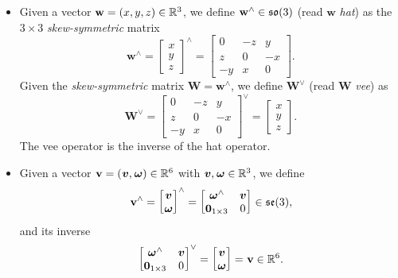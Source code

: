 \begin{itemize}
\item
Given a vector $\mathbf{w} = (x, y, z) \in \mathbb{R}^3$, we define $\mathbf{w}^\wedge \in \mathfrak{so}(3)$ (read $\mathbf{w}$ \emph{hat}) as the $3 \times 3$ \emph{skew-symmetric} matrix
%
\begin{equation*}
    \mathbf{w}^\wedge = \begin{bmatrix} x \\ y \\ z \end{bmatrix}^\wedge = \begin{bmatrix} 0 & -z & y \\ z & 0 & -x \\ -y & x & 0 \end{bmatrix}
    .
\end{equation*}
%
Given the \emph{skew-symmetric} matrix $\mathbf{W} = \mathbf{w}^\wedge$, we define $\mathbf{W}^\vee$ (read $\mathbf{W}$ \emph{vee}) as
%
\begin{equation*}
    \mathbf{W}^\vee = \begin{bmatrix} 0 & -z & y \\ z & 0 & -x \\ -y & x & 0 \end{bmatrix}^\vee = \begin{bmatrix} x \\ y \\ z \end{bmatrix}.
\end{equation*}
%
The vee operator is the inverse of the hat operator.

\item
Given a vector $\prescript{}{}{\mathbf{v}} = (\prescript{}{}{\boldsymbol{v}}, \prescript{}{}{\boldsymbol{\omega}}) \in \mathbb{R}^6$ with $\prescript{}{}{\boldsymbol{v}}, \prescript{}{}{\boldsymbol{\omega}} \in \mathbb{R}^3$, we define
%
\begin{equation*}
    \prescript{}{}{\mathbf{v}}^\wedge 
    = \begin{bmatrix} \prescript{}{}{\boldsymbol{v}} \\ \prescript{}{}{\boldsymbol{\omega}} \end{bmatrix}^\wedge
    = \begin{bmatrix} \prescript{}{}{\boldsymbol{\omega}}^\wedge & \prescript{}{}{\boldsymbol{v}} \\ \boldsymbol{0}_{1\times3} & 0 \end{bmatrix}
    \in \mathfrak{se}(3)
    ,
\end{equation*}
%
and its inverse
%
\begin{equation*}
    \begin{bmatrix} \prescript{}{}{\boldsymbol{\omega}}^\wedge & \prescript{}{}{\boldsymbol{v}} \\ \boldsymbol{0}_{1\times3} & 0 \end{bmatrix}^\vee
    = \begin{bmatrix} \prescript{}{}{\boldsymbol{v}} \\ \prescript{}{}{\boldsymbol{\omega}} \end{bmatrix}
    = \prescript{}{}{\mathbf{v}} \in \mathbb{R}^6
    .
\end{equation*}
%
\end{itemize}

